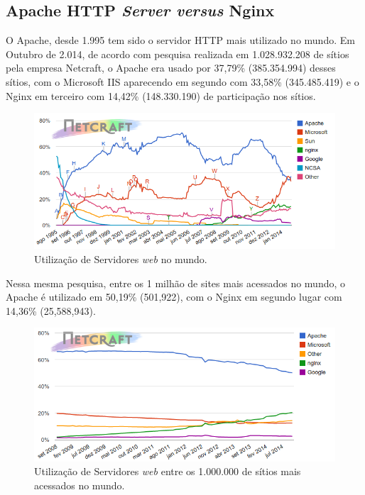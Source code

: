 \subsection{Apache HTTP \textit{Server versus} Nginx}
O Apache, desde 1.995 tem sido o servidor HTTP mais utilizado no mundo. Em Outubro de 2.014, de acordo com pesquisa realizada em 1.028.932.208 de sítios pela empresa Netcraft, o Apache era usado por 37,79\% (385.354.994) desses sítios, com o Microsoft IIS aparecendo em segundo com 33,58\% (345.485.419) e o Nginx em terceiro com 14,42\% (148.330.190) de participação nos sítios.\\

\begin{figure}[h!]
	\centering
	\includegraphics[width=0.6\linewidth]{figuras/grafico1}  
	\caption{Utilização de Servidores \textit{web} no mundo.}
	\label{fig:webservers-utilizacao}
\end{figure}

Nessa mesma pesquisa, entre os 1 milhão de sites mais acessados no mundo, o Apache é utilizado em 50,19\% (501,922), com o Nginx em segundo lugar com 14,36\% (25,588,943).\\

\begin{figure}[h!]
	\centering
	\includegraphics[width=0.6\linewidth]{figuras/grafico2} 
	\caption{Utilização de Servidores \textit{web} entre os 1.000.000 de sítios mais acessados no mundo.}
	\label{fig:webservers-utilizacao-milhao}
\end{figure}

